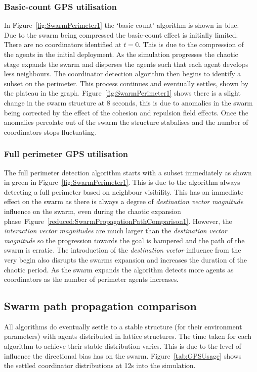 \documentclass{ieeeaccess}
\begin{document}
\subsubsection{Basic-count GPS utilisation\label{section:SwarmPerimeter3}}
In Figure~\ref{fig:SwarmPerimeter1} the `basic-count' algorithm is shown in blue. Due to the swarm being compressed the basic-count effect is initially limited. There are no coordinators identified at $t=0$. This is due to the compression of the agents in the initial deployment. As the simulation progresses the chaotic stage expands the swarm and disperses the agents such that each agent develops less neighbours. The coordinator detection algorithm then begins to identify a subset on the perimeter. This process continues and eventually settles, shown by the plateau in the graph. Figure~\ref{fig:SwarmPerimeter1} shows there is a slight change in the swarm structure at 8 seconds, this is due to anomalies in the swarm being corrected by the effect of the cohesion and repulsion field effects. Once the anomalies percolate out of the swarm the structure stabalises and the number of coordinators stops fluctuating.

\subsubsection{Full perimeter GPS utilisation\label{section:SwarmPerimeter4}}
The full perimeter detection algorithm starts with a subset immediately as shown in green in Figure~\ref{fig:SwarmPerimeter1}. This is due to the algorithm always detecting a full perimeter based on neighbour visibility. This has an immediate effect on the swarm as there is always a degree of \textit{destination vector magnitude} influence on the swarm, even during the chaotic expansion phase~Figure~\ref{reduced:SwarmPropagationPathComparison1}. However, the \textit{interaction vector magnitudes} are much larger than the \textit{destination vector magnitude} so the progression towards the goal is hampered and the path of the swarm is erratic. The introduction of the \textit{destination vector} influence from the very begin also disrupts the swarms expansion and increases the duration of the chaotic period. As the swarm expands the algorithm detects more agents as coordinators as the number of perimeter agents increases.

\subsection{Swarm path propagation comparison\label{section:compareBaselineAll1}}
All algorithms do eventually settle to a stable structure (for their environment parameters) with agents distributed in lattice structures. The time taken for each algorithm to achieve their stable distribution varies. This is due to the level of influence the directional bias has on the swarm. Figure~\ref{tab:GPSUsage} shows the settled coordinator distributions at 12s into the simulation.
\end{document}
